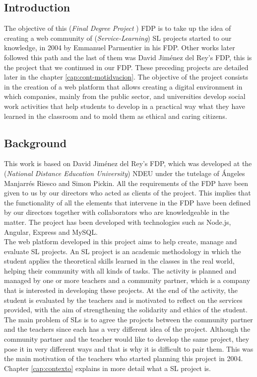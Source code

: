 \documentclass[11pt]{book}
\begin{document}
\begin{itemize}
		\chapter{Introduction}
		The objective of this (\textit{Final Degree Project} ) FDP is to take up the idea of creating a web community of (\emph{Service-Learning}) SL projects started to our knowledge, in 2004 by Emmanuel Parmentier in his FDP. Other works later followed this path and the last of them was David Jiménez del Rey's FDP, this is the project that we continued in our FDP. These preceding projects are detailed later in the chapter \ref{cap:cont-motidvacion}. The objective of the project consists in the creation of a web platform that allows creating a digital environment in which companies, mainly from the public sector, and universities develop social work activities that help students to develop in a practical way what they have learned in the classroom and to mold them as ethical and caring citizens.
		
		\section{Background}
		This work is based on David Jiménez del Rey's FDP, which was developed at the (\emph{National Distance Education University}) NDEU under the tutelage of Ángeles Manjarrés Riesco and Simon Pickin. All the requirements of the FDP have been given to us by our directors who acted as clients of the project. This implies that the functionality of all the elements that intervene in the FDP have been defined by our directors together with collaborators who are knowledgeable in the matter. The project has been developed with technologies such as Node.js, Angular, Express and MySQL. \\
		The web platform developed in this project aims to help create, manage and evaluate SL projects. An SL project is an academic methodology in which the student applies the theoretical skills learned in the classes in the real world, helping their community with all kinds of tasks. The activity is planned and managed by one or more teachers and a community partner, which is a company that is interested in developing these projects. At the end of the activity, the student is evaluated by the teachers and is motivated to reflect on the services provided, with the aim of strengthening the solidarity and ethics of the student. \\
		The main problem of SLs is to agree the projects between the community partner and the teachers since each has a very different idea of the project. Although the community partner and the teacher would like to develop the same project, they pose it in very different ways and that is why it is difficult to pair them. This was the main motivation of the teachers who started planning this project in 2004. Chapter \ref{cap:contexto} explains in more detail what a SL project is. \\
		

\end{itemize}
\end{document}
